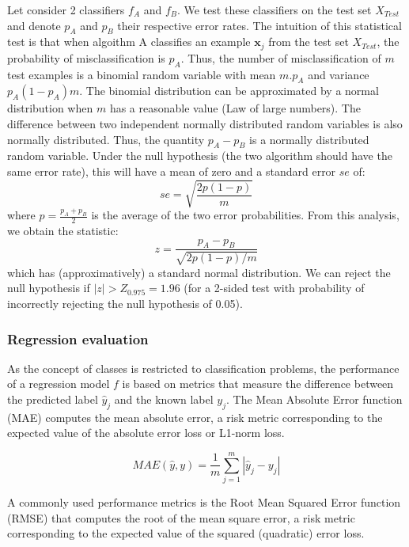 Let consider 2 classifiers $f_A$ and $f_B$. We test these classifiers on the test set $X_{Test}$ and denote $p_A$ and $p_B$ their respective error rates. The intuition of this statistical test is that when algoithm A classifies an example $\textbf{x}_j$ from the test set $X_{Test}$, the probability of misclassification is $p_A$. Thus, the number of misclassification of $m$ test examples is a binomial random variable with mean $m.p_A$ and variance $p_A(1-p_A)m$. The binomial distribution can be approximated by a normal distribution when $m$ has a reasonable value (Law of large numbers). The difference between two independent normally distributed random variables is also normally distributed. Thus, the quantity $p_A-p_B$ is a normally distributed random variable. Under the null hypothesis (the two algorithm should have the same error rate), this will have a mean of zero and a standard error $se$ of:
\begin{equation}
se = \sqrt{\frac{2p(1-p)}{m}}
\end{equation}
\noindent where $p=\frac{p_A+p_B}{2}$ is the average of the two error probabilities. From this analysis, we obtain the statistic:
\begin{equation}
z=\frac{p_A-p_B}{\sqrt{2p(1-p)/m}}
\end{equation}
\noindent which has (approximatively) a standard normal distribution. We can reject the null hypothesis if $|z| > Z_{0.975} = 1.96$ (for a 2-sided test with probability of incorrectly rejecting the null hypothesis of 0.05).


\subsubsection{Regression evaluation}
As the concept of classes is restricted to classification problems, the performance of a regression model $f$ is based on metrics that measure the difference between the predicted label $\hat{y}_j$ and the known label $y_j$. The Mean Absolute Error function (MAE) computes the mean absolute error, a risk metric corresponding to the expected value of the absolute error loss or L1-norm loss.

\begin{equation}
MAE(\hat{y},y) = \frac{1}{m} \sum_{j=1}^m|\hat{y}_j-y_j|
\end{equation}

A commonly used performance metrics is the Root Mean Squared Error function (RMSE) that computes the root of the mean square error, a risk metric corresponding to the expected value of the squared (quadratic) error loss.


